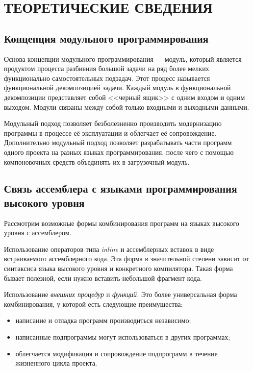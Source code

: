 \section{ТЕОРЕТИЧЕСКИЕ СВЕДЕНИЯ}

\subsection{Концепция модульного программирования}

Основа концепции модульного программирования --- модуль, который является
продуктом процесса разбиения большой задачи на ряд более мелких функционально
самостоятельных подзадач. Этот процесс называется функциональной декомпозицией
задачи. Каждый модуль в функциональной декомпозиции представляет собой
<<черный ящик>> с одним входом и одним выходом. Модули связаны между собой
только входными и выходными данными.

Модульный подход позволяет безболезненно производить модернизацию программы
в процессе её эксплуатации и облегчает её сопровождение. Дополнительно модульный
подход позволяет разрабатывать части программ одного проекта на разных языках
программирования, после чего с помощью компоновочных средств объединять их в
загрузочный модуль.

\subsection{Связь ассемблера с языками программирования \\ высокого уровня}
\label{sub:asm_and_high_lang}

Рассмотрим возможные формы комбинирования программ на языках высокого уровня
с ассемблером.

Использование операторов типа \textit{inline} и ассемблерных вставок в виде
встраиваемого ассемблерного кода. Эта форма в значительной степени зависит от
синтаксиса языка высокого уровня и конкретного компилятора. Такая форма
бывает полезной, если нужно вставить небольшой фрагмент кода.

Использование \textit{внешних процедур} и \textit{функций.} Это более
универсальная форма комбинирования, у которой есть следующие преимущества:
\begin{itemize}
  \item написание и отладка программ производиться независимо;
  \item написанные подпрограммы могут использоваться в других программах;
  \item облегчается модификация и сопровождение подпрограмм в течение жизненного
    цикла проекта.
\end{itemize}

